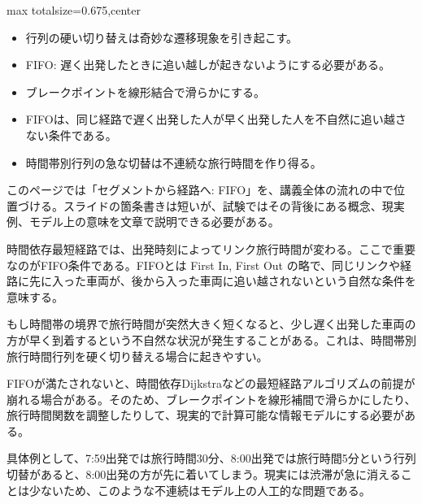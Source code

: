 \clearpage
{}
\begin{adjustbox}{max totalsize={\textwidth}{0.675\textheight},center}
\begin{minipage}{\textwidth}\scriptsize
\begin{minipage}[t]{0.485\textwidth}
\begin{itemize}
\item 行列の硬い切り替えは奇妙な遷移現象を引き起こす。
\item FIFO: 遅く出発したときに追い越しが起きないようにする必要がある。
\item ブレークポイントを線形結合で滑らかにする。
\end{itemize}
\begin{itemize}
\item FIFOは、同じ経路で遅く出発した人が早く出発した人を不自然に追い越さない条件である。
\item 時間帯別行列の急な切替は不連続な旅行時間を作り得る。
\end{itemize}
\end{minipage}\hfill
\begin{minipage}[t]{0.485\textwidth}
このページでは「セグメントから経路へ: FIFO」を、講義全体の流れの中で位置づける。スライドの箇条書きは短いが、試験ではその背後にある概念、現実例、モデル上の意味を文章で説明できる必要がある。\par
時間依存最短経路では、出発時刻によってリンク旅行時間が変わる。ここで重要なのがFIFO条件である。FIFOとは First In, First Out の略で、同じリンクや経路に先に入った車両が、後から入った車両に追い越されないという自然な条件を意味する。\par
もし時間帯の境界で旅行時間が突然大きく短くなると、少し遅く出発した車両の方が早く到着するという不自然な状況が発生することがある。これは、時間帯別旅行時間行列を硬く切り替える場合に起きやすい。\par
FIFOが満たされないと、時間依存Dijkstraなどの最短経路アルゴリズムの前提が崩れる場合がある。そのため、ブレークポイントを線形補間で滑らかにしたり、旅行時間関数を調整したりして、現実的で計算可能な情報モデルにする必要がある。\par
具体例として、7:59出発では旅行時間30分、8:00出発では旅行時間5分という行列切替があると、8:00出発の方が先に着いてしまう。現実には渋滞が急に消えることは少ないため、このような不連続はモデル上の人工的な問題である。\par

\end{minipage}
\end{minipage}
\end{adjustbox}
